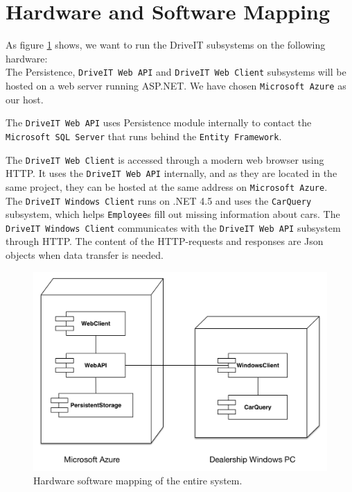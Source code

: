 \section{Hardware and Software Mapping}
As figure \ref{fig:Hardware-Software-Mapping} shows, we want to run the DriveIT subsystems on the following hardware:\\

The Persistence, \texttt{DriveIT Web API} and \texttt{DriveIT Web Client} subsystems will be hosted on a web server running ASP.NET. We have chosen \texttt{Microsoft Azure} as our host.

The \texttt{DriveIT Web API} uses Persistence module internally to contact the \texttt{Microsoft SQL Server} that runs behind the \texttt{Entity Framework}.

The \texttt{DriveIT Web Client} is accessed through a modern web browser using HTTP. It uses the \texttt{DriveIT Web API} internally, and as they are located in the same project, they can be hosted at the same address on \texttt{Microsoft Azure}.\\

The \texttt{DriveIT Windows Client} runs on .NET 4.5 and uses the \texttt{CarQuery} subsystem, which helps \texttt{Employee}s fill out missing information about cars. The \texttt{DriveIT Windows Client} communicates with the \texttt{DriveIT Web API} subsystem through HTTP. The content of the HTTP-requests and responses are Json objects when data transfer is needed.

\begin{figure}[H]
	\centering
	\includegraphics[width=\textwidth]{Figures/HardwareSoftwareMapping}
	\caption{Hardware software mapping of the entire system.}
	\label{fig:Hardware-Software-Mapping}
\end{figure}